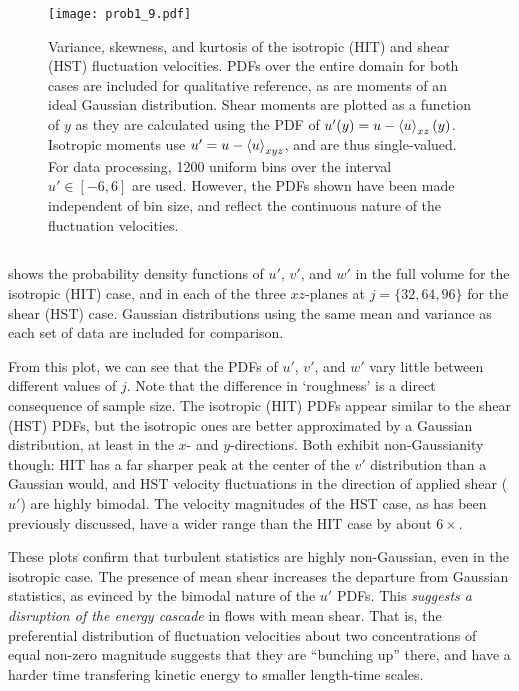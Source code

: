 \documentclass[11pt]{article}
\begin{document}
\begin{figure}[t]
\centering
\texttt{[image: prob1\_9.pdf]}
\vspace{-6pt}
\caption{Variance, skewness, and kurtosis of the isotropic (HIT) and shear (HST) fluctuation velocities. PDFs over the entire domain for both cases are included for qualitative reference, as are moments of an ideal Gaussian distribution. Shear moments are plotted as a function of $y$ as they are calculated using the PDF of $u'(y) = u - \left< u \right>_{xz}(y)$. Isotropic moments use $u' = u - \left< u \right>_{xyz}$, and are thus single-valued. For data processing, 1200 uniform bins over the interval $u' \in [-6,6]$ are used. However, the PDFs shown have been made independent of bin size, and reflect the continuous nature of the fluctuation velocities.}
\label{fig:prob_1_9_skew_kurtosis}
\end{figure}

\subsection{}

 shows the probability density functions of $u'$, $v'$, and $w'$ in the full volume for the isotropic (HIT) case, and in each of the three $xz$-planes at $j=\{32,64,96\}$ for the shear (HST) case. Gaussian distributions using the same mean and variance as each set of data are included for comparison.

From this plot, we can see that the PDFs of $u'$, $v'$, and $w'$ vary little between different values of $j$. Note that the difference in `roughness' is a direct consequence of sample size. The isotropic (HIT) PDFs appear similar to the shear (HST) PDFs, but the isotropic ones are better approximated by a Gaussian distribution, at least in the $x$- and $y$-directions. Both exhibit non-Gaussianity though: HIT has a far sharper peak at the center of the $v'$ distribution than a Gaussian would, and HST velocity fluctuations in the direction of applied shear ($u'$) are highly bimodal. The velocity magnitudes of the HST case, as has been previously discussed, have a wider range than the HIT case by about $6\times$.

These plots confirm that turbulent statistics are highly non-Gaussian, even in the isotropic case. The presence of mean shear increases the departure from Gaussian statistics, as evinced by the bimodal nature of the $u'$ PDFs. This \emph{suggests a disruption of the energy cascade} in flows with mean shear. That is, the preferential distribution of fluctuation velocities about two concentrations of equal non-zero magnitude suggests that they are ``bunching up'' there, and have a harder time transfering kinetic energy to smaller length-time scales.
\end{document}
